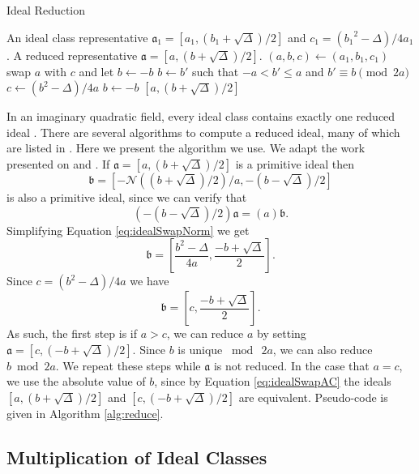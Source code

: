 \documentclass{ucalgthes1}
\theoremstyle{definition}
\begin{document}
\begin{algorithm}[h]
\caption{Ideal Reduction}
\label{alg:reduce}
\begin{algorithmic}[1]
\REQUIRE An ideal class representative $\mathfrak a_1 = [a_1, (b_1+\sqrt\Delta)/2]$ and $c_1 = ({b_1}^2 - \Delta)/4a_1$.
\ENSURE A reduced representative $\mathfrak a = [a, (b+\sqrt\Delta)/2]$.
\STATE $(a, b, c) \gets (a_1, b_1, c_1)$
		\STATE swap $a$ with $c$ and let $b \gets -b$
	\ENDIF
		\STATE $b \gets b'$ such that $-a < b' \le a$ and $b' \equiv b \pmod{2a}$
		\STATE $c \gets (b^2-\Delta)/4a$
	\ENDIF
\ENDWHILE
{}
	\STATE $b \gets -b$
\ENDIF
\RETURN $[a, (b+\sqrt\Delta)/2]$
\end{algorithmic}
\end{algorithm}

In an imaginary quadratic field, every ideal class contains exactly one reduced ideal \cite[p.20]{Ramachandran2006}.  There are several algorithms to compute a reduced ideal, many of which are listed in \cite{Jacobson2006}.  Here we present the algorithm we use.  We adapt the work presented on \cite[p.90]{Jacobson2006} and \cite[p.99]{Jacobson2009}. If $\mathfrak a = [a, (b + \sqrt\Delta)/2]$ is a primitive ideal then 
\begin{equation}
\label{eq:idealSwapNorm}
	\mathfrak b = \left[ -\mathcal N((b + \sqrt\Delta)/2)/a, -(b - \sqrt\Delta)/2 \right]
\end{equation}
is also a primitive ideal, since we can verify that
\[
	\left(-(b - \sqrt\Delta)/2 \right) \mathfrak a = (a) \mathfrak b.
\]
Simplifying Equation \ref{eq:idealSwapNorm} we get
\[
	\mathfrak b = \left[ \frac{b^2-\Delta}{4a}, \frac{-b + \sqrt\Delta}{2} \right].
\]
Since $c = (b^2 - \Delta)/4a$ we have
\begin{equation}
\label{eq:idealSwapAC}
	\mathfrak b = \left[ c, \frac{-b + \sqrt\Delta}{2} \right].
\end{equation}
As such, the first step is if $a > c$, we can reduce $a$ by setting $\mathfrak a = [c, (-b + \sqrt\Delta)/2]$.  Since $b$ is unique $\bmod{~2a}$, we can also reduce $b \bmod{2a}$.  We repeat these steps while $\mathfrak a$ is not reduced.  In the case that $a = c$, we use the absolute value of $b$, since by Equation \ref{eq:idealSwapAC} the ideals $[a, (b + \sqrt\Delta)/2]$ and $[c, (-b+\sqrt\Delta)/2]$ are equivalent.  Pseudo-code is given in Algorithm \ref{alg:reduce}.


\subsection{Multiplication of Ideal Classes}
\label{subsec:idealMultiply}
\end{document}
